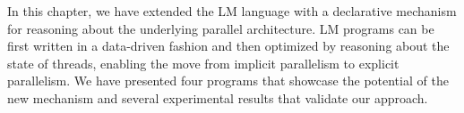 
In this chapter, we have extended the LM language with a declarative mechanism
for reasoning about the underlying parallel architecture. LM programs can be
first written in a data-driven fashion and then optimized by reasoning about the
state of threads, enabling the move from implicit parallelism to explicit
parallelism. We have presented four programs that showcase the potential of the
new mechanism and several experimental results that validate our approach.
